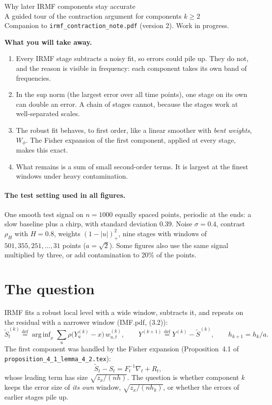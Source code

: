 \documentclass[11pt]{article}
\newcommand{\defeq}{\stackrel{\mathrm{def}}{=}}
\newcommand{\arginf}{\mathop{\mathrm{arg\,inf}}}
\newcommand{\IMFt}{\widetilde S}
\begin{document}
\begin{center}
{\LARGE Why later IRMF components stay accurate}\\[4pt]
{\large A guided tour of the contraction argument for components \(k\ge2\)}\\[4pt]
{\normalsize Companion to \texttt{irmf\_contraction\_note.pdf} (version 2). Work in progress.}
\end{center}

\begin{idea}
\textbf{What you will take away.}
\begin{enumerate}\setlength{\itemsep}{1pt}
\item Every IRMF stage subtracts a noisy fit, so errors could pile up.  They
  do not, and the reason is visible in frequency: each component takes its
  own band of frequencies.
\item In the sup norm (the largest error over all time points), one stage on
  its own can double an error.  A chain of stages cannot, because the
  stages work at well-separated scales.
\item The robust fit behaves, to first order, like a linear smoother with
  \emph{bent weights}, \(W_\phi\).  The Fisher expansion of the first
  component, applied at every stage, makes this exact.
\item What remains is a sum of small second-order terms.  It is largest at
  the finest windows under heavy contamination.
\end{enumerate}
\end{idea}

\paragraph{The test setting used in all figures.}
One smooth test signal on \(n=1000\) equally spaced points, periodic at the
ends: a slow baseline plus a chirp, with standard deviation 0.39.  Noise
\(\sigma=0.4\), contrast \(\rho_H\) with \(H=0.8\), weights \((1-|u|)_+^2\),
nine stages with windows of \(501,355,251,\dots,31\) points (\(a=\sqrt2\)).
Some figures also use the same signal multiplied by three, or add
contamination to 20\% of the points.


\section{The question}

IRMF fits a robust local level with a wide window, subtracts it, and repeats
on the residual with a narrower window (IMF.pdf, (3.2)):
\[
  \IMFt^{(k)}_t\defeq\arginf_x\sum_u\rho\bigl(Y^{(k)}_u-x\bigr)\,w^{(k)}_{u,t},
  \qquad Y^{(k+1)}\defeq Y^{(k)}-\IMFt^{(k)},\qquad h_{k+1}=h_k/a .
\]
The first component was handled by the Fisher expansion
(Proposition~4.1 of \texttt{proposition\_4\_1\_lemma\_4\_2.tex}):
\[
  \IMFt_t-S_t=F_t^{-1}\nabla_t+R_t,
\]
whose leading term has size \(\sqrt{z_x/(nh)}\).  The question is whether
component \(k\) keeps the error size of \emph{its own} window,
\(\sqrt{z_x/(nh_k)}\), or whether the errors of earlier stages pile up.
\end{document}
